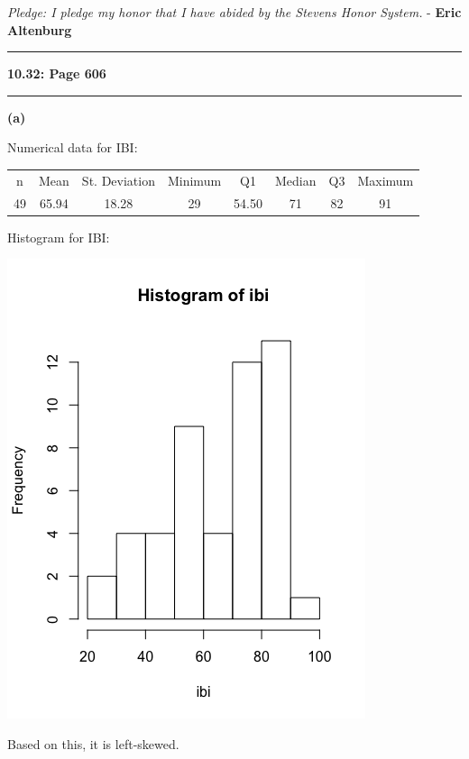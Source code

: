 \documentclass[11pt]{article}
\newcommand\question[2]{\vspace{.25in}\hrule\textbf{#1: #2}\vspace{.5em}\hrule\vspace{.10in}}
\renewcommand\part[1]{\vspace{.10in}\textbf{(#1)}\par}
\begin{document}
\raggedright
\newcommand\NAME{Eric Altenburg}	%
\newcommand\COURSE{MA-331} 		%
\newcommand\HWNUM{7}              		%


\begin{center}
	\textit{Pledge: I pledge my honor that I have abided by the Stevens Honor System.} - \textbf{\NAME}
\end{center}


\question{10.32}{Page 606}
	\part{a}
		Numerical data for IBI:\par
		
		\begin{center}
		\begin{tabular}{cccccccc}
			n & Mean & St. Deviation & Minimum & Q1 & Median & Q3 & Maximum\\
			49 & 65.94 & 18.28 & 29 & 54.50 & 71 & 82 & 91\\
		\end{tabular}\par
		\end{center}
		Histogram for IBI:\par
		
		\begin{center}
		\includegraphics[scale=0.5]{images/ibihist.png}
		\end{center}\par
		Based on this, it is left-skewed.\par
		
\end{document}
